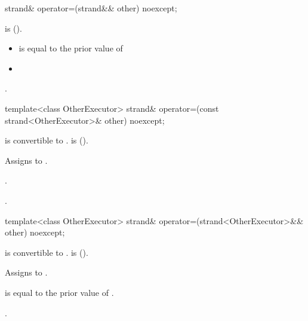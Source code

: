 \begin{itemdecl}
strand& operator=(strand&& other) noexcept;
\end{itemdecl}

\begin{itemdescr}
\pnum
\requires {} is  ().

\pnum
\postconditions
\begin{itemize}
\item
{} is equal to the prior value of 
\item
{}
\end{itemize}

\pnum
\returns {}.
\end{itemdescr}

\begin{itemdecl}
template<class OtherExecutor> strand& operator=(const strand<OtherExecutor>& other) noexcept;
\end{itemdecl}

\begin{itemdescr}
\pnum
\requires {} is convertible to .  is  ().

\pnum
\effects Assigns  to .

\pnum
\postconditions {}.

\pnum
\returns {}.
\end{itemdescr}

\begin{itemdecl}
template<class OtherExecutor> strand& operator=(strand<OtherExecutor>&& other) noexcept;
\end{itemdecl}

\begin{itemdescr}
\pnum
\requires {} is convertible to .  is  ().

\pnum
\effects Assigns  to .

\pnum
\postconditions {} is equal to the prior value of .

\pnum
\returns {}.
\end{itemdescr}



